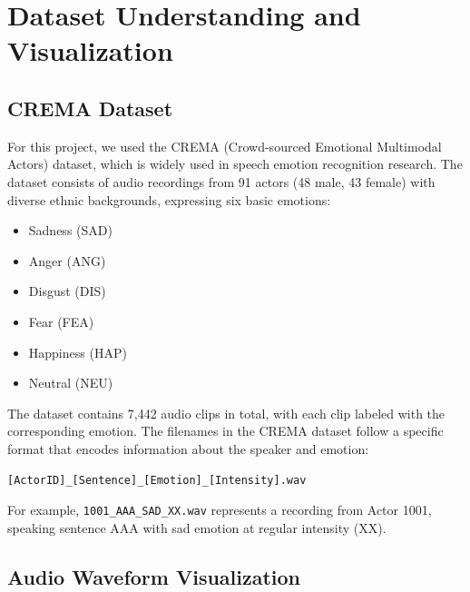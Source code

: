 \section{Dataset Understanding and Visualization}

\subsection{CREMA Dataset}

For this project, we used the CREMA (Crowd-sourced Emotional Multimodal Actors) dataset, which is widely used in speech emotion recognition research. The dataset consists of audio recordings from 91 actors (48 male, 43 female) with diverse ethnic backgrounds, expressing six basic emotions:

\begin{itemize}
    \item Sadness (SAD)
    \item Anger (ANG)
    \item Disgust (DIS)
    \item Fear (FEA)
    \item Happiness (HAP)
    \item Neutral (NEU)
\end{itemize}

The dataset contains 7,442 audio clips in total, with each clip labeled with the corresponding emotion. The filenames in the CREMA dataset follow a specific format that encodes information about the speaker and emotion: 

\texttt{[ActorID]\_[Sentence]\_[Emotion]\_[Intensity].wav}

For example, \texttt{1001\_AAA\_SAD\_XX.wav} represents a recording from Actor 1001, speaking sentence AAA with sad emotion at regular intensity (XX).

\subsection{Audio Waveform Visualization}

